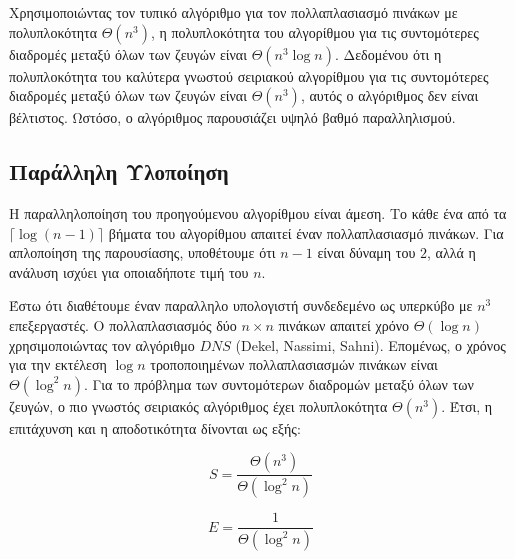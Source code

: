 \documentclass[12pt,a4paper]{article}
\begin{document}
Χρησιμοποιώντας τον τυπικό αλγόριθμο για τον πολλαπλασιασμό πινάκων με πολυπλοκότητα $\Theta(n^3)$, η πολυπλοκότητα του αλγορίθμου για τις συντομότερες διαδρομές μεταξύ όλων των ζευγών είναι $\Theta(n^3\log n)$. Δεδομένου ότι η πολυπλοκότητα του καλύτερα γνωστού σειριακού αλγορίθμου για τις συντομότερες διαδρομές μεταξύ όλων των ζευγών είναι $\Theta(n^3)$, αυτός ο αλγόριθμος δεν είναι βέλτιστος. Ωστόσο, ο αλγόριθμος παρουσιάζει υψηλό βαθμό παραλληλισμού.

\subsection*{Παράλληλη Υλοποίηση}
Η παραλληλοποίηση του προηγούμενου αλγορίθμου είναι άμεση. Το κάθε ένα από τα \mbox{$\lceil\log(n-1)\rceil$} βήματα του αλγορίθμου απαιτεί έναν πολλαπλασιασμό πινάκων. Για απλοποίηση της παρουσίασης, υποθέτουμε ότι $n-1$ είναι δύναμη του $2$, αλλά η ανάλυση ισχύει για οποιαδήποτε τιμή του $n$.

Έστω ότι διαθέτουμε έναν παραλληλο υπολογιστή συνδεδεμένο ως υπερκύβο με $n^3$ επεξεργαστές. Ο πολλαπλασιασμός δύο $n\times n$ πινάκων απαιτεί χρόνο $\Theta(\log n)$ χρησιμοποιώντας τον αλγόριθμο $DNS$ (\foreignlanguage{english}{Dekel, Nassimi, Sahni}). Επομένως, ο χρόνος για την εκτέλεση $\log n$ τροποποιημένων πολλαπλασιασμών πινάκων είναι $\Theta(\log^2 n)$. Για το πρόβλημα των συντομότερων διαδρομών μεταξύ όλων των ζευγών, ο πιο γνωστός σειριακός αλγόριθμος έχει πολυπλοκότητα $\Theta(n^3)$. Έτσι, η επιτάχυνση και η αποδοτικότητα δίνονται ως εξής:

\[
S = \frac{\Theta(n^3)}{\Theta(\log^2 n)}
\]

\[
E = \frac{1}{\Theta(\log^2 n)}
\]
\vspace{0.3cm}
\begin{figure}[ht]
\centering
{}
\end{figure}
\end{document}
